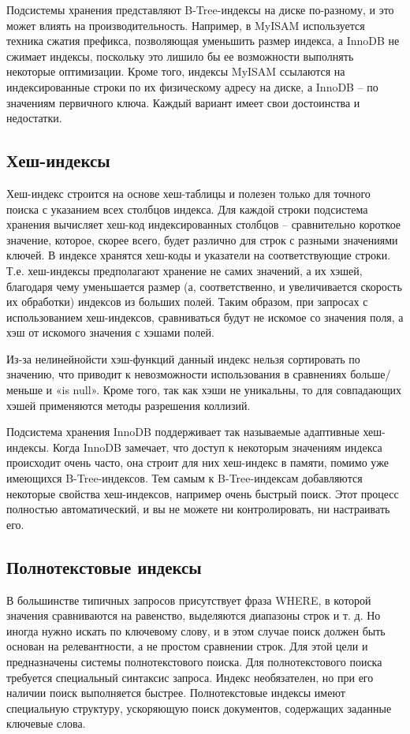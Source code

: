 Подсистемы хранения представляют B-Tree-индексы на диске по-разному, и это может влиять на производительность. Например, в MyISAM используется техника сжатия префикса, позволяющая уменьшить размер индекса, а InnoDB не сжимает индексы, поскольку это лишило бы ее возможности выполнять некоторые оптимизации. Кроме того, индексы MyISAM ссылаются на индексированные строки по их физическому адресу на диске, а InnoDB – по значениям первичного ключа. Каждый вариант имеет свои достоинства и недостатки.

\subsection{Хеш-индексы}

Хеш-индекс строится на основе хеш-таблицы и полезен только для точного поиска с указанием всех столбцов индекса. Для каждой строки подсистема хранения вычисляет хеш-код индексированных столбцов – сравнительно короткое значение, которое, скорее всего, будет различно для строк с разными значениями ключей. В индексе хранятся хеш-коды и указатели на соответствующие строки. Т.е. хеш-индексы предполагают хранение не самих значений, а их хэшей, благодаря чему уменьшается размер (а, соответственно, и увеличивается скорость их обработки) индексов из больших полей. Таким образом, при запросах с использованием хеш-индексов, сравниваться будут не искомое со значения поля, а хэш от искомого значения с хэшами полей. 

Из-за нелинейнойсти хэш-функций данный индекс нельзя сортировать по значению, что приводит к невозможности использования в сравнениях больше/меньше и «is null». Кроме того, так как хэши не уникальны, то для совпадающих хэшей применяются методы разрешения коллизий.

Подсистема хранения InnoDB поддерживает так называемые адап­тивные хеш-индексы. Когда InnoDB замечает, что доступ к некоторым значениям индекса происходит очень часто, она строит для них хеш-индекс в памяти, помимо уже имеющихся B-Tree-индексов. Тем самым к B-Tree-индексам добавляются некоторые свойства хеш-индексов, например очень быстрый поиск. Этот процесс полностью автоматический, и вы не можете ни контролировать, ни настраивать его.

\subsection{Полнотекстовые индексы}

В большинстве типичных запросов присутствует фраза WHERE, в которой значения сравниваются на равенство, выделяются диапазоны строк и т. д. Но иногда нужно искать по ключевому слову, и в этом случае поиск должен быть основан на релевантности, а не простом сравнении строк. Для этой цели и предназначены системы полнотекстового поиска. Для полнотекстового поиска требуется специальный синтаксис запроса. Индекс необязателен, но при его наличии поиск выполняется быстрее. Полнотекстовые индексы имеют специальную структуру, ускоряющую поиск документов, содержащих заданные ключевые слова.

